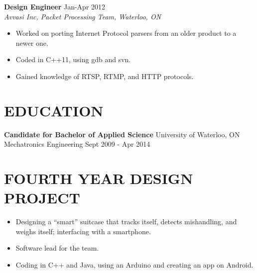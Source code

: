 \documentclass[line]{res}
\begin{document}
\begin{resume}
        {\bf Design Engineer} \hfill Jan-Apr 2012 \\
        {\sl Avvasi Inc, Packet Processing Team, Waterloo, ON} \\
        \begin{itemize}
        \item Worked on porting Internet Protocol parsers from an older product to a newer one.
        \item Coded in C++11, using gdb and svn.
        \item Gained knowledge of RTSP, RTMP, and HTTP protocols.
        \end{itemize}

\section{EDUCATION}
        {\bf Candidate for Bachelor of Applied Science} \hfill University of Waterloo, ON \\
        Mechatronics Engineering \hfill Sept 2009 - Apr 2014

\section{FOURTH YEAR DESIGN PROJECT}
        \begin{itemize}
        \item Designing a ``smart'' suitcase that tracks itself, detects mishandling, and weighs itself; interfacing with a smartphone.
        \item Software lead for the team.
        \item Coding in C++ and Java, using an Arduino and creating an app on Android.
        \end{itemize}
\end{resume}
\end{document}
